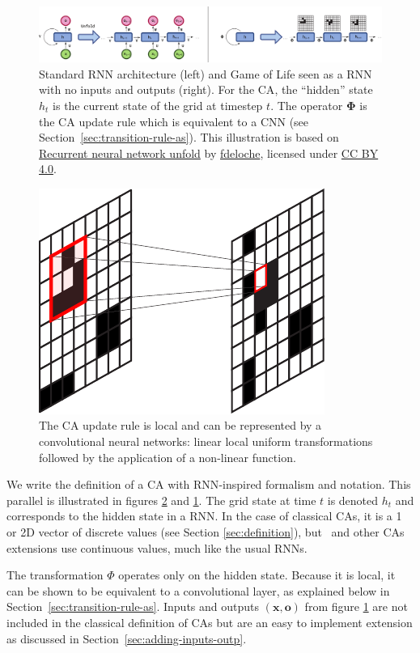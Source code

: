 \begin{figure}[htbp]
  \centering
  \includegraphics[width=\linewidth]{figures/rnn_and_gol.pdf}
  \caption{\label{fig:standard_rnn} Standard RNN architecture (left) and Game of
    Life seen as a RNN with no inputs and outputs (right). For the \ac{CA}, the
    ``hidden'' state $h_t$ is the current state of the grid at timestep $t$. The
    operator $\boldsymbol{\Phi}$ is the \ac{CA} update rule which is
    equivalent to a \ac{CNN} (see Section~\ref{sec:transition-rule-as}). This
    illustration is based on
    \href{https://commons.wikimedia.org/wiki/File:Recurrent_neural_network_unfold.svg}{Recurrent
      neural network unfold} by
    \href{https://commons.wikimedia.org/wiki/User:Ixnay}{fdeloche}, licensed
    under \href{https://creativecommons.org/licenses/by-sa/4.0/}{CC BY 4.0}.}
\end{figure}


\begin{figure}[htbp]
  \centering
  \includegraphics[width=.3\linewidth]{figures/ca_cnn}
  \caption{\label{fig:ca_cnn}The CA update rule is local and can be represented
    by a convolutional neural networks: linear local uniform transformations
    followed by the application of a non-linear function.}
\end{figure}

We write the definition of a \ac{CA} with \ac{RNN}-inspired formalism and
notation. This parallel is illustrated in figures \ref{fig:ca_cnn} and
\ref{fig:standard_rnn}. The grid state at time $t$ is denoted $h_t$ and
corresponds to the hidden state in a RNN\@. In the case of classical \acp{CA},
it is a 1 or 2D vector of discrete values (see Section \ref{sec:definition}),
but~\parencite{mordvintsevGrowingNeuralCellular2020} and other \acp{CA}
extensions use continuous values, much like the usual \acp{RNN}.

The transformation $\Phi$ operates only on the hidden state. Because it is local,
it can be shown to be equivalent to a convolutional layer, as explained below in
Section~\ref{sec:transition-rule-as}. Inputs and outputs
$(\mathbf{x}, \mathbf{o})$ from figure \ref{fig:standard_rnn} are not included
in the classical definition of CAs but are an easy to implement extension as
discussed in Section~\ref{sec:adding-inputs-outp}.

